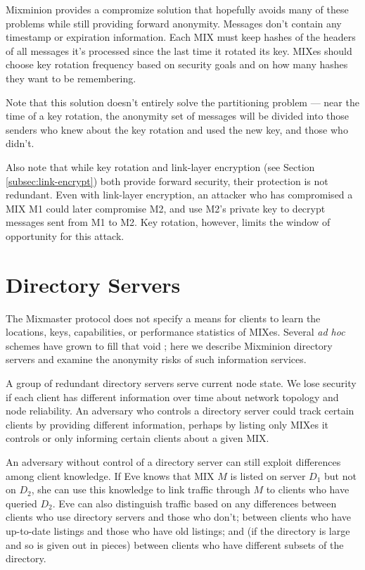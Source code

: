 \documentclass{llncs}
\begin{document}
Mixminion provides a compromize solution that hopefully avoids many of
these problems while still providing forward anonymity. Messages don't
contain any timestamp or expiration information. Each MIX must keep
hashes of the headers of all messages it's processed since the last time
it rotated its key. MIXes should choose key rotation frequency based on
security goals and on how many hashes they want to be remembering.

Note that this solution doesn't entirely solve the partitioning problem
--- near the time of a key rotation, the anonymity set of messages will
be divided into those senders who knew about the key rotation and used
the new key, and those who didn't.

Also note that while key rotation and link-layer encryption (see Section
\ref{subsec:link-encrypt}) both provide forward security, their
protection is not redundant.  Even with link-layer encryption, an
attacker who has compromised a MIX M1 could later compromise M2, and
use M2's private key to decrypt messages sent from M1 to M2.  Key
rotation, however, limits the window of opportunity for this attack.



\section{Directory Servers}
\label{sec:dir-servers}

The Mixmaster protocol does not specify a means for clients to learn the
locations, keys, capabilities, or performance statistics of MIXes. Several
\emph{ad hoc} schemes have grown to fill that void \cite{levien}; here
we describe Mixminion directory servers and examine the anonymity risks
of such information services.

A group of redundant directory servers serve current node state. We lose
security if each client has different information over time about network
topology and node reliability. An adversary who controls a directory
server could track certain clients by providing different information,
perhaps by listing only MIXes it controls or only informing certain
clients about a given MIX.

An adversary without control of a directory server can still exploit
differences among client knowledge. If Eve knows that MIX $M$ is listed
on server $D_1$ but not on $D_2$, she can use this knowledge to link
traffic through $M$ to clients who have queried $D_2$.  Eve can also
distinguish traffic based on any differences between clients who use
directory servers and those who don't; between clients who have up-to-date
listings and those who have old listings; and (if the directory is large
and so is given out in pieces) between clients who have different subsets
of the directory.
\end{document}
